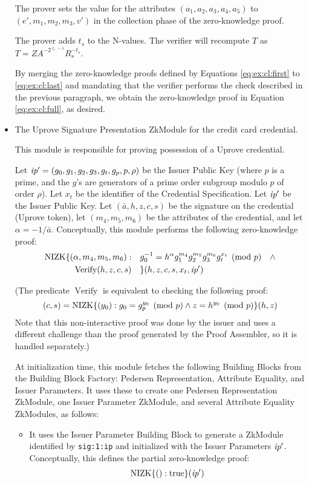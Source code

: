 \begin{itemize}
The prover sets the value for the attributes $(a_1, a_2, a_3, a_4, a_5)$ to
$(e', m_1, m_2, m_3, v')$ in the collection phase of the
zero-knowledge proof.

The prover adds $t_s$ to the N-values.
The verifier will recompute $T$ as
$T = ZA^{-2^{\ell_e-1}}R_s^{-t_s}$.

By merging the zero-knowledge proofs defined by Equations
\ref{eq:ex:cl:first} to
\ref{eq:ex:cl:last}
and mandating that the verifier performs the check described in the previous paragraph,
we obtain the zero-knowledge proof in Equation
\ref{eq:ex:cl:full}, as desired.

\item The Uprove Signature Presentation ZkModule for the credit card credential.

This module is responsible for proving possession of a Uprove credential.

Let $\emph{ip}' = (g_0, g_1, g_2, g_3, g_t, g_p, p, \rho)$ be the Issuer Public Key (where
$p$ is a prime, and the $g$'s are generators of a prime order subgroup modulo $p$ of order $\rho$).
Let $x_t$ be the identifier of the Credential Specification. Let $\emph{ip}'$ be the Issuer
Public Key.
Let $(\bar a, h, z, c, s)$ be the signature on the credential (Uprove token), let $(m_4, m_5, m_6)$ be
the attributes of the credential, and let $\alpha = -1/\bar a$.
Conceptually, this module performs the following zero-knowledge proof:
\begin{align}
\label{eq:ex:uprove:full}
\operatorname{NIZK}\lbrace (\alpha, m_4, m_5, m_6): &\quad
g_0^{-1} = h^\alpha g_1^{m_4} g_2^{m_5} g_3^{m_6} g_t^{x_t} \pmod{p} \quad \wedge \nonumber\\
\operatorname{Verify}(h, z, c, s) & \quad
\rbrace(h, z, c, s, x_t, \emph{ip}')
\end{align}

(The predicate $\operatorname{Verify}$ is equivalent to checking the following proof:
$$(c, s) = \operatorname{NIZK}\lbrace(y_0): g_0 = g_p^{y_0} \pmod{p} \wedge z = h^{y_0} \pmod{p}\rbrace(h, z)$$
Note that this non-interactive proof was done by the issuer and uses a different challenge
than the proof generated by the Proof Assembler, so it is handled separately.)

At initialization time, this module fetches the following Building Blocks from the
Building Block Factory: Pedersen Representation, Attribute Equality, and Issuer Parameters.
It uses these to create one Pedersen Representation ZkModule,
one Issuer Parameter ZkModule, and several
Attribute Equality ZkModules, as follows:
\begin{itemize}
\item It uses the Issuer Parameter Building Block to generate a ZkModule identified
by \texttt{sig:1:ip} and initialized with the Issuer Parameters $\emph{ip}'$.
Conceptually, this defines the partial zero-knowledge proof:
\begin{align}
\label{eq:ex:uprove:first}
\operatorname{NIZK}\lbrace(): \operatorname{true}\rbrace(\emph{ip}')
\end{align}


\end{itemize}
\end{itemize}
